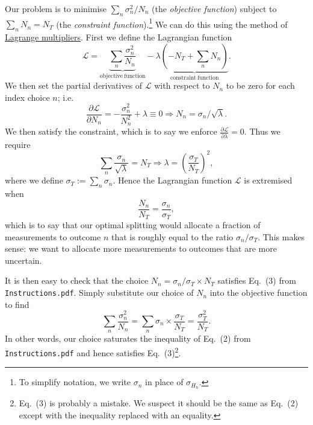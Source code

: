 \documentclass{article}
\begin{document}
\noindent
Our problem is to minimise $\sum_n \sigma_n^2/N_n$
(the \emph{objective function}) subject to $\sum_n N_n = N_T$
(the \emph{constraint function}).\footnote{%
To simplify notation, we write $\sigma_n$ in place of $\sigma_{H_n}$.}
We can do this using the method of \href{https://en.wikipedia.org/wiki/Lagrange_multiplier}{Lagrange multipliers}.
First we define the Lagrangian function
\begin{equation}
  \mathcal{L} =
  \underbrace{\sum_n \frac{\sigma_n^2}{N_n}}_{\mathrm{objective\ function}}
  - \lambda \underbrace{\left( -N_T + \sum_n N_n \right)}_{\mathrm{constraint\ function}}.
\end{equation}
We then set the partial derivatives of $\mathcal{L}$ with respect to $N_n$ to be zero for each index choice $n$; i.e.
\begin{equation}
  \frac{\partial \mathcal{L}}{\partial N_n} = - \frac{\sigma_n^2}{N_n^2} + \lambda \equiv 0
  \Longrightarrow N_n = \sigma_n/\sqrt{\lambda}.
\end{equation}
We then satisfy the constraint, which is to say we enforce $\frac{\partial \mathcal{L}}{\partial \lambda} = 0$. Thus we require
\begin{equation}
  \sum_n \frac{\sigma_n}{\sqrt{\lambda}} = N_T
  \Longrightarrow \lambda = \left(\frac{\sigma_T}{N_T}\right)^2,
\end{equation}
where we define $\sigma_T := \sum_n \sigma_n$.
Hence the Lagrangian function $\mathcal{L}$ is extremised when
\begin{equation}
   \frac{N_n}{N_T} = \frac{\sigma_n}{\sigma_T},
\end{equation}
which is to say that our optimal splitting would allocate 
a fraction of measurements to outcome $n$ that is roughly equal to the ratio
$\sigma_n/\sigma_T$. This makes sense: we want to allocate more measurements 
to outcomes that are more uncertain.

It is then easy to check that the choice $N_n = \sigma_n/\sigma_T \times N_T$
satisfies Eq.~(3) from \texttt{Instructions.pdf}. Simply substitute our choice
of $N_n$ into the objective function to find
\begin{equation}
  \sum_n \frac{\sigma_n^2}{N_n}
  = \sum_n \sigma_n \times \frac{\sigma_T}{N_T}
  = \frac{\sigma_T^2}{N_T}.
\end{equation}
In other words, our choice saturates the inequality of Eq.~(2) from \texttt{Instructions.pdf} and hence satisfies Eq.~(3)\footnote{%
Eq.~(3) is probably a mistake. We suspect it should be the same as Eq.~(2) except with the inequality replaced with an equality.}.
\end{document}
